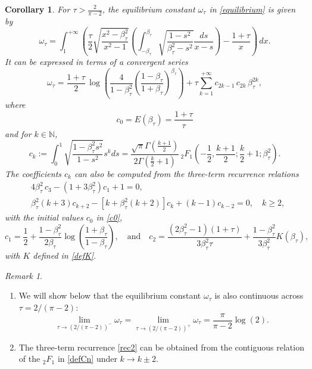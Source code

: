 \documentclass[reqno,11pt]{amsart}
\theoremstyle{plain}
\newtheorem{corollary}[theorem]{Corollary}
\theoremstyle{definition}
\theoremstyle{remark}
\newtheorem{remark}[theorem]{Remark}
\numberwithin{equation}{section}
\newcommand{\N}{\mathbb{N}}
\begin{document}
\begin{corollary}
 For $\tau>\frac{2}{\pi-2}$, the equilibrium constant $\omega_\tau$ in \eqref{equilibrium} is given by
\begin{equation}\label{equilibrium_constant_tau>2/(pi-2)}
 \omega_\tau    = \int_1^{+\infty} \left(\frac{\tau}{2}\sqrt{\frac{x^2-\beta_\tau^2}{x^2-1}}\left( \int_{-\beta_\tau}^{\beta_\tau}\sqrt{\frac{1-s^2}{\beta_\tau^2-s^2}}\frac{ds}{x-s} \right)-\frac{1+\tau}{x}\right)\,dx.
    \end{equation}
It can be expressed in terms of a convergent series
\begin{equation}
    \label{powerseriesomega}
\omega_\tau=  \frac{1+\tau}{2}\, \log \left(\frac{4}{1-\beta_\tau^2}
   \left(\frac{1-\beta_\tau}{1+\beta_\tau}\right)^{\beta_\tau}\right) +  \tau \sum_{k=1}^{+\infty}    c_{2k-1}   \, c_{2k} \, \beta_\tau^{2k} ,
\end{equation}
where 
\begin{equation}
    \label{c0}
c_0=E(\beta_\tau)=\frac{1+\tau}{\tau}
\end{equation}
and for $k\in \N$,
\begin{equation}
    \label{defCn}
c_k:=\int_{0}^{1}\sqrt{\frac{1-\beta_\tau^2s^2}{1-s^2}}s^k ds  =\frac{\sqrt{\pi} \Gamma\left(\frac{k+1}{2}\right)}{2 \Gamma\left(\frac{k}{2}+1\right)}\, { }_2 F_1\left(-\frac{1}{2}, \frac{k+1}{2} ; \frac{k}{2}+1 ; \beta_\tau^2\right) .
\end{equation}
The coefficients $c_k$ can also be computed from the three-term recurrence relations
\begin{equation}
    \label{rec2}
    \begin{split}
      & 4 \beta_\tau^2\, c_3-\left(1+3 \beta_\tau^2\right) c_1+1=0  , \\
&\beta_\tau^2(k+3) c_{k+2}-\left[k+\beta_\tau^2(k+2)\right] c_k+(k-1) c_{k-2}=0, \quad k \geq 2 ,
    \end{split}
\end{equation}
with the initial values $c_0$ in \eqref{c0}, 
$$
c_1= \frac{1}{2}+\frac{1-\beta_\tau^2}{2 \beta_\tau} \log\left(\frac{1+\beta_\tau}{1-\beta_\tau} \right) , \quad \text{and} \quad c_2= \frac{(2\beta_\tau^2-1)(1+\tau)}{3 \beta_\tau^2 \tau}  +\frac{1-\beta_\tau^2}{3 \beta_\tau^2}K\left( \beta_\tau\right),
$$
with $K$ defined in \eqref{defK}.
\end{corollary}
\begin{remark}
\begin{enumerate}
\item[\textit{(i)}] 
We will show below that the equilibrium constant $\omega_\tau$ is also continuous across $\tau=2/(\pi-2)$:
$$
\lim_{\tau \to (2/(\pi-2))^-} \omega_\tau = \lim_{\tau \to (2/(\pi-2))^+} \omega_\tau=\frac{\pi}{\pi-2}\log(2).
$$

\item[\textit{(ii)}] The three-term recurrence \eqref{rec2} can be obtained from the contiguous relation of the ${ }_2 F_1$ in \eqref{defCn} under $k \rightarrow k \pm 2$.
\end{enumerate}
\end{remark}
\end{document}
